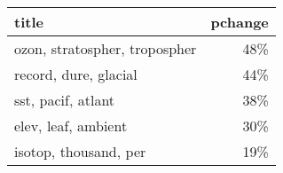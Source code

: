 \begin{tabular}{p{1.2cm}r}
\toprule
                         title &  pchange \\
\midrule
 ozon, stratospher, tropospher &      48\% \\
         record, dure, glacial &      44\% \\
            sst, pacif, atlant &      38\% \\
           elev, leaf, ambient &      30\% \\
         isotop, thousand, per &      19\% \\
\bottomrule
\end{tabular}
